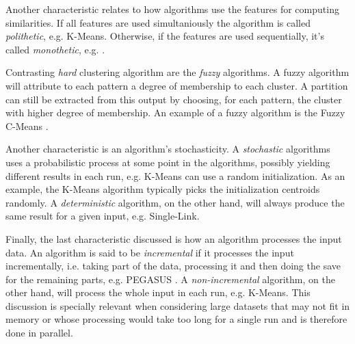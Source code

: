 Another characteristic relates to how algorithms use the features for computing similarities.
If all features are used simultaniously the algorithm is called \emph{polithetic}, e.g. K-Means.
Otherwise, if the features are used sequentially, it's called \emph{monothetic}, e.g. \cite{Chavent1998}.

Contrasting \emph{hard} clustering algorithm are the \emph{fuzzy} algorithms.
A fuzzy algorithm will attribute to each pattern a degree of membership to each cluster.
A partition can still be extracted from this output by choosing, for each pattern, the cluster with higher degree of membership.
An example of a fuzzy algorithm is the Fuzzy C-Means \cite{Bezdek1984}.

Another characteristic is an algorithm's stochasticity.
A \emph{stochastic} algorithms uses a probabilistic process at some point in the algorithms, possibly yielding different results in each run, e.g. K-Means can use a random initialization.
As an example, the K-Means algorithm typically picks the initialization centroids randomly.
A \emph{deterministic} algorithm, on the other hand, will always produce the same result for a given input, e.g. Single-Link.

Finally, the last characteristic discussed is how an algorithm processes the input data.
An algorithm is said to be \emph{incremental} if it processes the input incrementally, i.e. taking part of the data, processing it and then doing the save for the remaining parts, e.g. PEGASUS \cite{Kang2011}.
A \emph{non-incremental} algorithm, on the other hand, will process the whole input in each run, e.g. K-Means.
This discussion is specially relevant when considering large datasets that may not fit in memory or whose processing would take too long for a single run and is therefore done in parallel.





